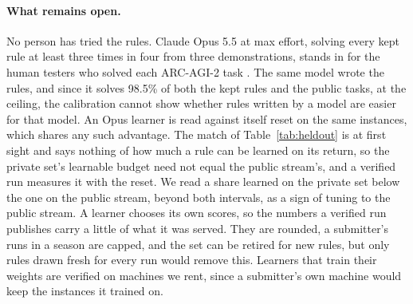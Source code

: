 \paragraph{What remains open.} No person has tried the rules. Claude Opus 5.5 at max effort, solving every kept rule at least three times in four from three demonstrations, stands in for the human testers who solved each ARC-AGI-2 task \citep{chollet2025arcagi2}. The same model wrote the rules, and since it solves 98.5\% of both the kept rules and the public tasks, at the ceiling, the calibration cannot show whether rules written by a model are easier for that model. An Opus learner is read against itself reset on the same instances, which shares any such advantage. The match of Table~\ref{tab:heldout} is at first sight and says nothing of how much a rule can be learned on its return, so the private set's learnable budget need not equal the public stream's, and a verified run measures it with the reset. We read a share learned on the private set below the one on the public stream, beyond both intervals, as a sign of tuning to the public stream. A learner chooses its own scores, so the numbers a verified run publishes carry a little of what it was served. They are rounded, a submitter's runs in a season are capped, and the set can be retired for new rules, but only rules drawn fresh for every run would remove this. Learners that train their weights are verified on machines we rent, since a submitter's own machine would keep the instances it trained on.
